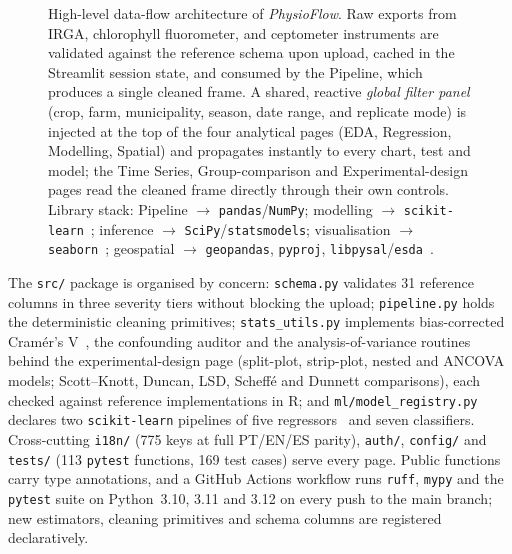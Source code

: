 \documentclass[11pt, letterpaper]{article}
\begin{document}
\begin{figure}[htbp]
{%
}
\caption{High-level data-flow architecture of \emph{PhysioFlow}. Raw exports from IRGA, chlorophyll fluorometer, and ceptometer instruments are validated against the reference schema upon upload, cached in the Streamlit session state, and consumed by the Pipeline, which produces a single cleaned frame. A shared, reactive \emph{global filter panel} (crop, farm, municipality, season, date range, and replicate mode) is injected at the top of the four analytical pages (EDA, Regression, Modelling, Spatial) and propagates instantly to every chart, test and model; the Time Series, Group-comparison and Experimental-design pages read the cleaned frame directly through their own controls. Library stack: Pipeline $\to$ \texttt{pandas}/\texttt{NumPy}; modelling $\to$ \texttt{scikit-learn}~\cite{Pedregosa2011}; inference $\to$ \texttt{SciPy}/\texttt{statsmodels}; visualisation $\to$ \texttt{seaborn}~\cite{Waskom2021,Hunter2007}; geospatial $\to$ \texttt{geopandas}, \texttt{pyproj}, \texttt{libpysal}/\texttt{esda}~\cite{Rey2007Pysal}.}\label{fig:architecture}
\end{figure}

The \texttt{src/} package is organised by concern: \texttt{schema.py} validates 31 reference columns in three severity tiers without blocking the upload; \texttt{pipeline.py} holds the deterministic cleaning primitives; \texttt{stats\_utils.py} implements bias-corrected Cram\'er's V~\cite{Bergsma2013}, the confounding auditor and the analysis-of-variance routines behind the experimental-design page (split-plot, strip-plot, nested and ANCOVA models; Scott--Knott, Duncan, LSD, Scheff\'e and Dunnett comparisons), each checked against reference implementations in R; and \texttt{ml/model\_registry.py} declares two \texttt{scikit-learn} pipelines of five regressors~\cite{Breiman2001,Friedman2001} and seven classifiers. Cross-cutting \texttt{i18n/} (775 keys at full PT/EN/ES parity), \texttt{auth/}, \texttt{config/} and \texttt{tests/} (113 \texttt{pytest} functions, 169 test cases) serve every page. Public functions carry type annotations, and a GitHub Actions workflow runs \texttt{ruff}, \texttt{mypy} and the \texttt{pytest} suite on Python~3.10, 3.11 and 3.12 on every push to the main branch; new estimators, cleaning primitives and schema columns are registered declaratively.
\end{document}
